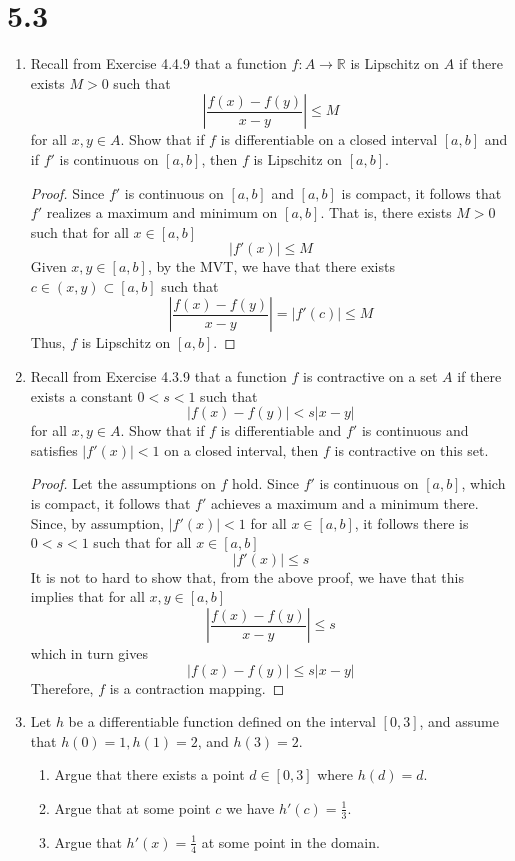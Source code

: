 \section*{5.3}
\begin{enumerate}
    \item Recall from Exercise 4.4.9 that a function \( f: A \rightarrow \mathbb{R} \) is Lipschitz on \( A \) if there exists \( M > 0 \) such that
    \[
    \left| \frac{f(x)-f(y)}{x-y} \right| \leq M
    \]
    for all \( x,y \in A \). Show that if \( f \) is differentiable on a closed interval \( [a,b] \) and if \( f' \) is continuous on \( [a,b] \), then \( f \) is Lipschitz on \( [a,b] \). 

\begin{proof}
Since \( f' \) is continuous on \( [a,b] \) and \( [a,b] \) is compact, it follows that \( f' \) realizes a maximum and minimum on \( [a,b] \). That is, there exists \( M > 0 \) such that for all \( x \in [a,b] \)
\[
\vert f'(x) \vert \leq M
\]
Given \( x,y \in [a,b] \), by the MVT, we have that there exists \( c \in (x,y) \subset [a,b] \) such that
\[
\left| \frac{f(x)-f(y)}{x-y} \right| = \vert f'(c) \vert \leq M
\]
Thus, \( f \) is Lipschitz on \( [a,b] \). 
\end{proof}

\item Recall from Exercise 4.3.9 that a function \( f \) is contractive on a set \( A \) if there exists a constant \( 0< s < 1 \) such that
\[
\vert f(x) - f(y) \vert < s \vert x-y \vert
\]
for all \( x, y \in A \). Show that if \( f \) is differentiable and \( f' \) is continuous and satisfies \( \vert f'(x) \vert < 1 \) on a closed interval, then \( f \) is contractive on this set.

\begin{proof}
Let the assumptions on \( f \) hold. Since \( f' \) is continuous on \( [a,b] \), which is compact, it follows that \( f' \) achieves a maximum and a minimum there. Since, by assumption, \( \vert f'(x) \vert < 1 \) for all \( x \in [a,b] \), it follows there is \( 0 < s < 1 \) such that for all \( x \in [a,b] \)
\[
\vert f'(x) \vert \leq s 
\]
It is not to hard to show that, from the above proof, we have that this implies that for all \( x, y \in [a,b] \)
\[
\left| \frac{f(x)-f(y)}{x-y} \right| \leq s
\]
which in turn gives
\[
\vert f(x)-f(y) \vert \leq s \vert x-y \vert
\]
Therefore, \( f \) is a contraction mapping.
\end{proof}

\item Let \( h \) be a differentiable function defined on the interval \( [0,3] \), and assume that \( h(0) = 1, h(1)=2\), and \( h(3)=2 \). 
\begin{enumerate}
    \item Argue that there exists a point \( d \in [0,3] \) where \( h(d) =d \).
    \item Argue that at some point \( c \) we have \( h'(c) = \frac{1}{3} \).
    \item Argue that \( h'(x) = \frac{1}{4} \) at some point in the domain.
\end{enumerate}


\end{enumerate}
